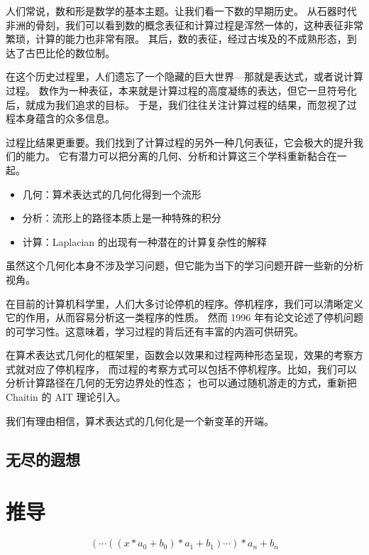 \documentclass[a4paper,12pt]{article}
\numberwithin{definition}{section}
\numberwithin{lemma}{section}
\numberwithin{proposition}{section}
\numberwithin{theorem}{section}
\numberwithin{grammar}{section}
\numberwithin{program}{section}
\numberwithin{convention}{section}
\numberwithin{corollary}{section}
\begin{document}
人们常说，数和形是数学的基本主题。让我们看一下数的早期历史。
从石器时代非洲的骨刻，我们可以看到数的概念表征和计算过程是浑然一体的，这种表征非常繁琐，计算的能力也非常有限。
其后，数的表征，经过古埃及的不成熟形态，到达了古巴比伦的数位制。

在这个历史过程里，人们遗忘了一个隐藏的巨大世界—那就是表达式，或者说计算过程。
数作为一种表征，本来就是计算过程的高度凝练的表达，但它一旦符号化后，就成为我们追求的目标。
于是，我们往往关注计算过程的结果，而忽视了过程本身蕴含的众多信息。

过程比结果更重要。我们找到了计算过程的另外一种几何表征，它会极大的提升我们的能力。
它有潜力可以把分离的几何、分析和计算这三个学科重新黏合在一起。

\begin{itemize}
    \item 几何：算术表达式的几何化得到一个流形
    \item 分析：流形上的路径本质上是一种特殊的积分
    \item 计算：Laplacian 的出现有一种潜在的计算复杂性的解释
\end{itemize}

虽然这个几何化本身不涉及学习问题，但它能为当下的学习问题开辟一些新的分析视角。

在目前的计算机科学里，人们大多讨论停机的程序。停机程序，我们可以清晰定义它的作用，从而容易分析这一类程序的性质。
然而 1996 年有论文论述了停机问题的可学习性。这意味着，学习过程的背后还有丰富的内涵可供研究。

在算术表达式几何化的框架里，函数会以效果和过程两种形态呈现，效果的考察方式就对应了停机程序，
而过程的考察方式可以包括不停机程序。比如，我们可以分析计算路径在几何的无穷边界处的性态；
也可以通过随机游走的方式，重新把 Chaitin 的 AIT 理论引入。

我们有理由相信，算术表达式的几何化是一个新变革的开端。

\subsection{无尽的遐想}

\newpage
{}
{}



\newpage
\appendix

\section{推导}

\begin{equation}
(\cdots ((x * a_0 + b_0) * a_1 + b_1) \cdots) * a_n + b_n
\end{equation}
\end{document}
